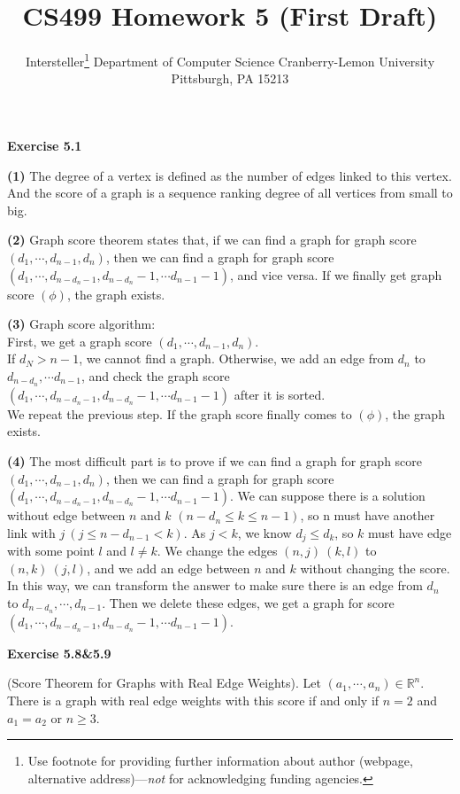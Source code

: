 \documentclass{article} %
\title{CS499 Homework 5 (First Draft)}
\author{
	Intersteller\thanks{ Use footnote for providing further information
		about author (webpage, alternative address)---\emph{not} for acknowledging
		funding agencies.}
	Department of Computer Science
	Cranberry-Lemon University
	Pittsburgh, PA 15213
}
\begin{document}
	\maketitle
	\textbf{Exercise 5.1}\par

\textbf{(1)} The degree of a vertex is defined as the number of edges linked to this vertex. And the score of a graph is a sequence ranking degree of all vertices from small to big.\par

\textbf{(2)} Graph score theorem states that, if we can find a graph for graph score $(d_1, \cdots ,d_{n-1},d_n)$, then we can find a graph for graph score $(d_1, \cdots ,d_{n-d_n-1},d_{n-d_n}-1,\cdots d_{n-1}-1)$, and vice versa. If we finally get graph score $(\phi)$, the graph exists.\par

\textbf{(3)} Graph score algorithm:\\
First, we get a graph score $(d_1, \cdots ,d_{n-1},d_n)$.\\
If $d_N>n-1$, we cannot find a graph. Otherwise, we add an edge from $d_n$ to $d_{n-d_n},\cdots d_{n-1}$, and check the graph score $(d_1, \cdots ,d_{n-d_n-1},d_{n-d_n}-1,\cdots d_{n-1}-1)$ after it is sorted.\\
We repeat the previous step. If the graph score finally comes to $(\phi)$, the graph exists.\par

\textbf{(4)} The most difficult part is to prove if we can find a graph for graph score $(d_1, \cdots ,d_{n-1},d_n)$, then we can find a graph for graph score $(d_1, \cdots ,d_{n-d_n-1},d_{n-d_n}-1,\cdots d_{n-1}-1)$. We can suppose there is a solution without edge between $n$ and $k$ $(n-d_n\leq k\leq n-1)$, so n must have another link with $j \ (j\leq n-d_{n-1}<k)$. As $j<k$, we know $d_j\leq d_k$, so $k$ must have edge with some point $l$ and $l\neq k$. We change the edges $(n,j)\  (k,l)$ to $(n,k)\  (j,l)$, and we add an edge between $n$ and $k$ without changing the score. In this way, we can transform the answer to make sure there is an edge from $d_n$ to $d_{n-d_n},\cdots ,d_{n-1}$. Then we delete these edges, we get a graph for score $(d_1, \cdots ,d_{n-d_n-1},d_{n-d_n}-1,\cdots d_{n-1}-1)$.\par

\textbf{Exercise 5.8\&5.9}\par
	(Score Theorem for Graphs with Real Edge Weights). Let $(a_1,\cdots, a_n)\in\mathbb{R}^n$. 
	There is a graph with real edge weights with this score if and only if $n=2$ and $a_1=a_2$ or $n\ge 3$.
	 
\end{document}

